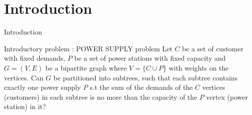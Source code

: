 \section{Introduction}

\begin{frame}{Introduction}
  \begin{block}{Introductory problem : POWER SUPPLY problem}
  Let $C$ be a set of customer with fixed demands, $P$ be a set of power stations with fixed capacity and $G = (V,E)$ be a bipartite graph where $V = \{C \cup P$\} with weights on the vertices.  \hfill \break
  \pause
  \hfill \break
  Can $G$ be partitioned into subtrees, such that each subtree contains exactly one power supply $P$ s.t the sum of the demands of the $C$ vertices (customers) in each subtree is no more than the capacity of the $P$ vertex (power station) in it?

  \end{block}
\end{frame}

